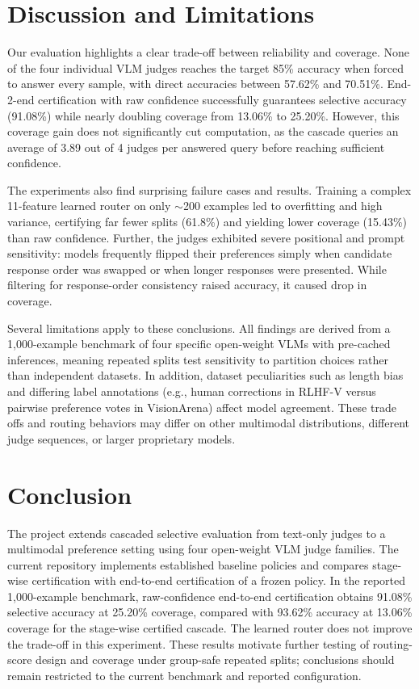\documentclass[11pt]{article}
\begin{document}
\section{Discussion and Limitations}
Our evaluation highlights a clear trade-off between reliability and coverage. None of the four individual VLM judges reaches the target 85\% accuracy when forced to answer every sample, with direct accuracies between 57.62\% and 70.51\%. End-2-end certification with raw confidence successfully guarantees selective accuracy (91.08\%) while nearly doubling coverage from 13.06\% to 25.20\%. However, this coverage gain does not significantly cut computation, as the cascade queries an average of 3.89 out of 4 judges per answered query before reaching sufficient confidence.

The experiments also find surprising failure cases and results. Training a complex 11-feature learned router on only $\sim$200 examples led to overfitting and high variance, certifying far fewer splits (61.8\%) and yielding lower coverage (15.43\%) than raw confidence. Further, the judges exhibited severe positional and prompt sensitivity: models frequently flipped their preferences simply when candidate response order was swapped or when longer responses were presented. While filtering for response-order consistency raised accuracy, it caused drop in coverage.

Several limitations apply to these conclusions. All findings are derived from a 1,000-example benchmark of four specific open-weight VLMs with pre-cached inferences, meaning repeated splits test sensitivity to partition choices rather than independent datasets. In addition, dataset peculiarities such as length bias and differing label annotations (e.g., human corrections in RLHF-V versus pairwise preference votes in VisionArena) affect model agreement. These trade offs and routing behaviors may differ on other multimodal distributions, different judge sequences, or larger proprietary models.

\section{Conclusion}
The project extends cascaded selective evaluation from text-only judges to a multimodal preference setting using four open-weight VLM judge families. The current repository implements established baseline policies and compares stage-wise certification with end-to-end certification of a frozen policy. In the reported 1,000-example benchmark, raw-confidence end-to-end certification obtains 91.08\% selective accuracy at 25.20\% coverage, compared with 93.62\% accuracy at 13.06\% coverage for the stage-wise certified cascade. The learned router does not improve the trade-off in this experiment. These results motivate further testing of routing-score design and coverage under group-safe repeated splits; conclusions should remain restricted to the current benchmark and reported configuration.
\end{document}

